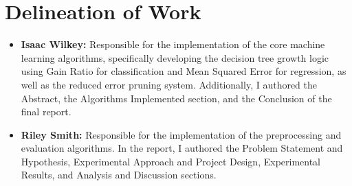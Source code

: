 \documentclass[twoside,11pt]{article}
\begin{document}
\section{Delineation of Work}
\begin{itemize}
    \item \textbf{Isaac Wilkey:} Responsible for the implementation of the core machine learning algorithms, specifically developing the decision tree growth logic using Gain Ratio for classification and Mean Squared Error for regression, as well as the reduced error pruning system. Additionally, I authored the Abstract, the Algorithms Implemented section, and the Conclusion of the final report.
    \item \textbf{Riley Smith:} Responsible for the implementation of the preprocessing and evaluation algorithms. In the report, I authored the Problem Statement and Hypothesis, Experimental Approach and Project Design, Experimental Results, and Analysis and Discussion sections. 
\end{itemize}
\end{document}
